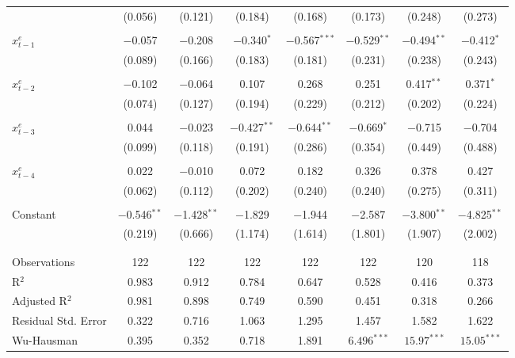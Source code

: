 \documentclass[11pt]{article}
\begin{document}
\begin{table}[!htbp]
\begin{threeparttable}
\begin{tabular}{@{\extracolsep{3pt}}lccccccc}
      & (0.056) & (0.121) & (0.184) & (0.168) & (0.173) & (0.248) & (0.273) \\ 
      & & & & & & & \\ 
      $x_{t-1}^e$ & $-$0.057 & $-$0.208 & $-$0.340$^{*}$ & $-$0.567$^{***}$ & $-$0.529$^{**}$ & $-$0.494$^{**}$ & $-$0.412$^{*}$ \\ 
      & (0.089) & (0.166) & (0.183) & (0.181) & (0.231) & (0.238) & (0.243) \\ 
      & & & & & & & \\ 
      $x_{t-2}^e$ & $-$0.102 & $-$0.064 & 0.107 & 0.268 & 0.251 & 0.417$^{**}$ & 0.371$^{*}$ \\ 
      & (0.074) & (0.127) & (0.194) & (0.229) & (0.212) & (0.202) & (0.224) \\ 
      & & & & & & & \\ 
      $x_{t-3}^e$  & 0.044 & $-$0.023 & $-$0.427$^{**}$ & $-$0.644$^{**}$ & $-$0.669$^{*}$ & $-$0.715 & $-$0.704 \\ 
      & (0.099) & (0.118) & (0.191) & (0.286) & (0.354) & (0.449) & (0.488) \\ 
      & & & & & & & \\ 
      $x_{t-4}^e$ & 0.022 & $-$0.010 & 0.072 & 0.182 & 0.326 & 0.378 & 0.427 \\ 
      & (0.062) & (0.112) & (0.202) & (0.240) & (0.240) & (0.275) & (0.311) \\ 
      & & & & & & & \\ 
    Constant & $-$0.546$^{**}$ & $-$1.428$^{**}$ & $-$1.829 & $-$1.944 & $-$2.587 & $-$3.800$^{**}$ & $-$4.825$^{**}$ \\ 
    & (0.219) & (0.666) & (1.174) & (1.614) & (1.801) & (1.907) & (2.002) \\ 
      & & & & & & & \\ 
      \hline \\[-1.8ex] 
      Observations & 122 & 122 & 122 & 122 & 122 & 120 & 118 \\ 
      R$^{2}$ & 0.983 & 0.912 & 0.784 & 0.647 & 0.528 & 0.416 & 0.373 \\ 
      Adjusted R$^{2}$ & 0.981 & 0.898 & 0.749 & 0.590 & 0.451 & 0.318 & 0.266 \\ 
      Residual Std. Error & 0.322 & 0.716 & 1.063 & 1.295 & 1.457 & 1.582 & 1.622 \\
      Wu-Hausman & 0.395& 0.352& 0.718& 1.891& $6.496^{***}$ &$15.97^{***}$& $15.05^{***}$ \\
      \hline 
      \hline
      \end{tabular} 

\end{threeparttable}
\end{table}
\end{document}

